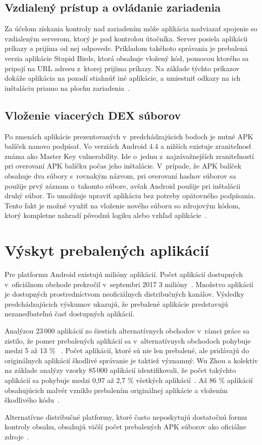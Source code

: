 \subsection*{Vzdialený prístup a ovládanie zariadenia}
Za účelom získania kontroly nad zariadením môže aplikácia nadviazať spojenie so vzdialeným serverom, ktorý je pod kontrolou útočníka. Server posiela aplikácii príkazy a prijíma od nej odpovede. Príkladom takéhoto správania je prebalená verzia aplikácie Stupid Birds, ktorá obsahuje vložený kód, pomocou ktorého sa pripojí na URL adresu z~ktorej prijíma príkazy. Na základe týchto príkazov dokáže aplikácia na pozadí stiahnúť iné aplikácie, a umiestniť odkazy na ich inštaláciu priamo na plochu zariadenia~\cite{fakeapps}. 

\subsection*{Vloženie viacerých DEX súborov}
Po zmenách aplikácie prezentovaných v~predchádzajúcich bodoch je nutné APK balíček nanovo podpísať. Vo verziách Android 4.4 a nižších existuje zraniteľnosť známa ako Master Key vulnerability. Ide o~jednu z~najzávažnejších zraniteľností pri overovaní APK balíčku počas jeho inštalácie. V~prípade, že APK balíček obsahuje dva súbory s~rovnakým názvom, pri overovaní hashov súborov sa použije prvý záznam o~takomto súbore, avšak Android použije pri inštalácii druhý súbor. To umožňuje upraviť aplikáciu bez potreby opätovného podpísania. Tento fakt je možné využiť na vloženie nového súboru so zdrojovým kódom, ktorý kompletne nahradí pôvodnú logiku alebo vzhľad aplikácie~\cite{Jung2013,c2gYRVCI9leJhfOJ}.

\section{Výskyt prebalených aplikácií}
Pre platformu Android existujú milióny aplikácií. Počet aplikácií dostupných v~oficiálnom obchode  prekročil v~septembri 2017 3 milióny~\cite{Statista}. Množstvo aplikácií je dostupných prostredníctvom neoficiálnych distribučných kanálov.  Výsledky predchádzajúcich výskumov ukazujú, že prebalené aplikácie predstavujú nezanedbateľnú časť dostupných aplikácií.

Analýzou 23\,000 aplikácií zo šiestich alternatívnych obchodov v~rámci práce  sa zistilo, že pomer prebalených aplikácií sa v~alternatívnych obchodoch pohybuje medzi 5 až 13 \% ~\cite{DetectingRepackagedZhou}.
Počet aplikácií, ktoré sú nie len prebalené, ale pridávajú do originálnych aplikácií škodlivé správanie je taktiež významný. Wu Zhou a kolektív na základe analýzy vzorky 85\,000 aplikácií identifikovali, že počet takýchto aplikácií sa pohybuje medzi 0,97 až 2,7 \% všetkých aplikácií~\cite{Zhou2013}.
Až 86 \% aplikácií obsahujúcich malvér vzniklo prebalením originálnej aplikácie a vložením škodlivého kódu~\cite{androidThreats}.

Alternatívne distribučné platformy, ktoré často neposkytujú dostatočnú formu kontroly obsahu, obsahujú väčší počet prebalených APK súborov ako oficiálne zdroje~\cite{Zhauniarovich2013}. 

